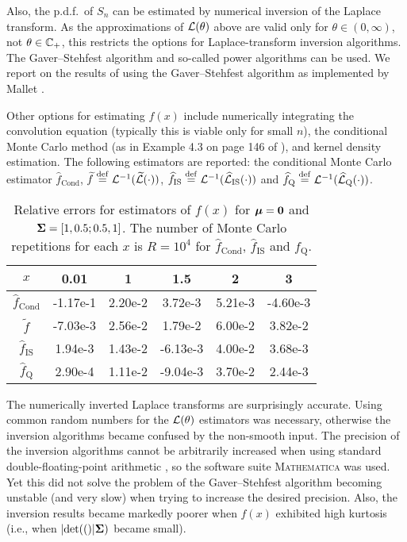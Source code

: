 Also, the p.d.f.\ of $S_n$ can be estimated by numerical inversion of the
Laplace transform. As the approximations of $\mathcal{L}(\theta)$ above are
valid only for $\theta \in (0, \infty)$, not $\theta \in \mathbb{C}_{+}$, this
restricts the options for Laplace-transform inversion algorithms. The
Gaver--Stehfest algorithm \cite{stehfest1970algorithm} and so-called power
algorithms \cite{avdis2007power} can be used. We report on the results of
using the Gaver--Stehfest algorithm as implemented by Mallet
\cite{mallet1985numerical}.

Other options for estimating $f(x)$ include numerically integrating the
convolution equation (typically this is viable only for small $n$), the
conditional Monte Carlo method (as in Example 4.3 on page 146 of
\cite{asmussen2007stochastic}), and kernel density estimation. The following
estimators are reported: the conditional Monte Carlo estimator
$\widehat{f}_{\mathrm{Cond}}$, $\widetilde{f} \overset{\mathrm{def}}{=}
\mathcal{L}^{-1}(\widetilde{\mathcal{L}}(\cdot))$, $\widehat{f}_{\mathrm{IS}} \overset{\mathrm{def}}{=}
\mathcal{L}^{-1}(\widehat{\mathcal{L}}_{\mathrm{IS}}(\cdot))$ and
$\widehat{f}_{\mathrm{Q}} \overset{\mathrm{def}}{=}
\mathcal{L}^{-1}(\widehat{\mathcal{L}}_{\mathrm{Q}}(\cdot))$.

\begin{table}[h]
\centering
\caption{Relative errors for estimators of $f(x)$ for $\bm{\mu} = \bm{0}$ and
  $\bm{\Sigma} = [1, 0.5; 0.5, 1]$. The number of Monte Carlo repetitions for
  each $x$ is $R=10^4$ for $\widehat{f}_{\mathrm{Cond}}$,
  $\widehat{f}_{\mathrm{IS}} $ and $\widehat{f}_{\mathrm{Q}} $.}
\vspace{3pt}
\begin{tabular}{cccccc}
\hline
{$x$}& 0.01 & 1 & 1.5 & 2 & 3 \\ \hline
$\widehat{f}_{\mathrm{Cond}}$\raisebox{1pt}{\vphantom{$\widehat{f}$}}&
{-1.17e-1 }& {2.20e-2 }& {3.72e-3 }& {5.21e-3 }& {-4.60e-3 } \\
{$\widetilde{f}$}&
{-7.03e-3}& {2.56e-2 }& {1.79e-2 }& {6.00e-2 }& {3.82e-2 } \\
{$\widehat{f}_{\mathrm{IS}}$}&
{1.94e-3 }& {1.43e-2 }& {-6.13e-3}& {4.00e-2 }& {3.68e-3 } \\
{$\widehat{f}_{\mathrm{Q}}$}&
{2.90e-4 }& {1.11e-2 }& {-9.04e-3}& {3.70e-2 }& {2.44e-3 } \\ \hline
\end{tabular}
\end{table}

The numerically inverted Laplace transforms are surprisingly accurate. Using
common random numbers for the $\mathcal{L}(\theta)$ estimators was necessary,
otherwise the inversion algorithms became confused by the non-smooth
input. The precision of the inversion algorithms cannot be arbitrarily
increased when using standard double-floating-point arithmetic
\cite{abate2006unified}, so the software suite \textsc{Mathematica} was
used. Yet this did not solve the problem of the Gaver--Stehfest algorithm
becoming unstable (and very slow) when trying to increase the desired
precision. Also, the inversion results became markedly poorer when $f(x)$
exhibited high kurtosis (i.e., when $\lvert \mathrm{det}(() \rvert\bm{\Sigma})$ became small).

